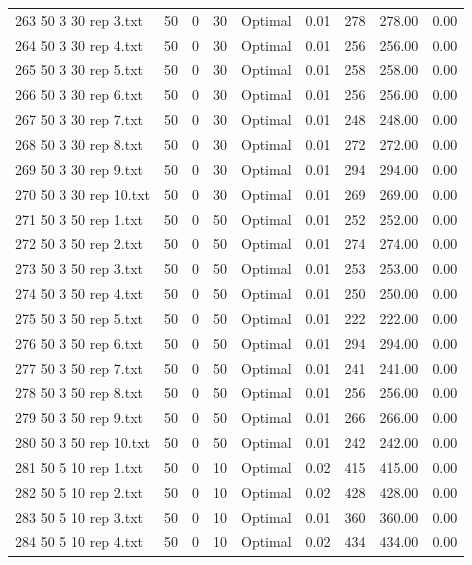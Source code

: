 \begin{longtable}{lrrllrrrr}
263 50 3 30 rep 3.txt & 50 & 0 & 30 & Optimal &  0.01 & 278 & 278.00 &  0.00\\
264 50 3 30 rep 4.txt & 50 & 0 & 30 & Optimal &  0.01 & 256 & 256.00 &  0.00\\
265 50 3 30 rep 5.txt & 50 & 0 & 30 & Optimal &  0.01 & 258 & 258.00 &  0.00\\
266 50 3 30 rep 6.txt & 50 & 0 & 30 & Optimal &  0.01 & 256 & 256.00 &  0.00\\
267 50 3 30 rep 7.txt & 50 & 0 & 30 & Optimal &  0.01 & 248 & 248.00 &  0.00\\
268 50 3 30 rep 8.txt & 50 & 0 & 30 & Optimal &  0.01 & 272 & 272.00 &  0.00\\
269 50 3 30 rep 9.txt & 50 & 0 & 30 & Optimal &  0.01 & 294 & 294.00 &  0.00\\
270 50 3 30 rep 10.txt & 50 & 0 & 30 & Optimal &  0.01 & 269 & 269.00 &  0.00\\
271 50 3 50 rep 1.txt & 50 & 0 & 50 & Optimal &  0.01 & 252 & 252.00 &  0.00\\
272 50 3 50 rep 2.txt & 50 & 0 & 50 & Optimal &  0.01 & 274 & 274.00 &  0.00\\
273 50 3 50 rep 3.txt & 50 & 0 & 50 & Optimal &  0.01 & 253 & 253.00 &  0.00\\
274 50 3 50 rep 4.txt & 50 & 0 & 50 & Optimal &  0.01 & 250 & 250.00 &  0.00\\
275 50 3 50 rep 5.txt & 50 & 0 & 50 & Optimal &  0.01 & 222 & 222.00 &  0.00\\
276 50 3 50 rep 6.txt & 50 & 0 & 50 & Optimal &  0.01 & 294 & 294.00 &  0.00\\
277 50 3 50 rep 7.txt & 50 & 0 & 50 & Optimal &  0.01 & 241 & 241.00 &  0.00\\
278 50 3 50 rep 8.txt & 50 & 0 & 50 & Optimal &  0.01 & 256 & 256.00 &  0.00\\
279 50 3 50 rep 9.txt & 50 & 0 & 50 & Optimal &  0.01 & 266 & 266.00 &  0.00\\
280 50 3 50 rep 10.txt & 50 & 0 & 50 & Optimal &  0.01 & 242 & 242.00 &  0.00\\
281 50 5 10 rep 1.txt & 50 & 0 & 10 & Optimal &  0.02 & 415 & 415.00 &  0.00\\
282 50 5 10 rep 2.txt & 50 & 0 & 10 & Optimal &  0.02 & 428 & 428.00 &  0.00\\
283 50 5 10 rep 3.txt & 50 & 0 & 10 & Optimal &  0.01 & 360 & 360.00 &  0.00\\
284 50 5 10 rep 4.txt & 50 & 0 & 10 & Optimal &  0.02 & 434 & 434.00 &  0.00\\

\end{longtable}
